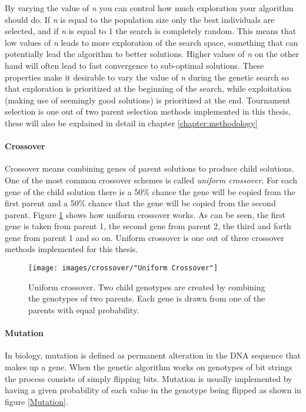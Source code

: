 \noindent By varying the value of \textit{n} you can control how much exploration your algorithm should do. If \textit{n} is equal to the population size only the best individuals are selected, and if \textit{n} is equal to 1 the search is completely random. This means that low values of \textit{n} leads to more exploration of the search space, something that can potentially lead the algorithm to better solutions. Higher values of \textit{n} on the other hand will often lead to fast convergence to sub-optimal solutions. These properties make it desirable to vary the value of \textit{n} during the genetic search so that exploration is prioritized at the beginning of the search, while exploitation (making use of seemingly good solutions) is prioritized at the end. Tournament selection is one out of two parent selection methods implemented in this thesis, these will also be explained in detail in chapter \ref{chapter:methodology}\\


\paragraph*{Crossover}
Crossover means combining genes of parent solutions to produce child solutions. One of the most common crossover schemes is called \textit{uniform crossover}. For each gene of the child solution there is a 50\% chance the gene will be copied from the first parent and a 50\% chance that the gene will be copied from the second parent. Figure \ref{Uniform Crossover} shows how uniform crossover works. As can be seen, the first gene is taken from parent 1, the second gene from parent 2, the third and forth gene from parent 1 and so on. Uniform crossover is one out of three crossover methods implemented for this thesis.


\begin{figure}[h!]
\begin{center}
\texttt{[image: images/crossover/"Uniform Crossover"]}
\caption{Uniform crossover. Two child genotypes are created by combining the genotypes of two parents. Each gene is drawn from one of the parents with equal probability.}
\label{Uniform Crossover}
\end{center}
\end{figure}


\paragraph*{Mutation}
In biology, mutation is defined as permanent alteration in the DNA sequence that makes up a gene. When the genetic algorithm works on genotypes of bit strings the process consists of simply flipping bits. Mutation is usually implemented by having a given probability of each value in the genotype being flipped as shown in figure \ref{Mutation}.\\


